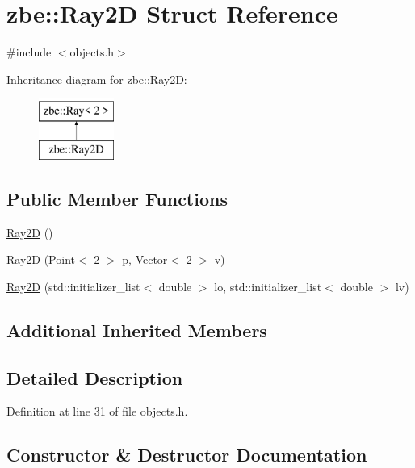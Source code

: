 \hypertarget{structzbe_1_1_ray2_d}{}\section{zbe\+:\+:Ray2\+D Struct Reference}
\label{structzbe_1_1_ray2_d}


{\ttfamily \#include $<$objects.\+h$>$}

Inheritance diagram for zbe\+:\+:Ray2\+D\+:\begin{figure}[H]
\begin{center}
\leavevmode
\includegraphics[height=2.000000cm]{structzbe_1_1_ray2_d}
\end{center}
\end{figure}
\subsection*{Public Member Functions}
\begin{DoxyCompactItemize}
\item 
\hyperlink{structzbe_1_1_ray2_d_aed7a0ed10788e292319d9008f1ac71b1}{Ray2\+D} ()
\item 
\hyperlink{structzbe_1_1_ray2_d_ac013ce11829eef5d663c135d6cfad339}{Ray2\+D} (\hyperlink{classzbe_1_1_point}{Point}$<$ 2 $>$ p, \hyperlink{classzbe_1_1_vector}{Vector}$<$ 2 $>$ v)
\item 
\hyperlink{structzbe_1_1_ray2_d_a69c7b3abf53ccbd453f12ec2785da112}{Ray2\+D} (std\+::initializer\+\_\+list$<$ double $>$ lo, std\+::initializer\+\_\+list$<$ double $>$ lv)
\end{DoxyCompactItemize}
\subsection*{Additional Inherited Members}


\subsection{Detailed Description}


Definition at line 31 of file objects.\+h.



\subsection{Constructor \& Destructor Documentation}
\hypertarget{structzbe_1_1_ray2_d_aed7a0ed10788e292319d9008f1ac71b1}{}
